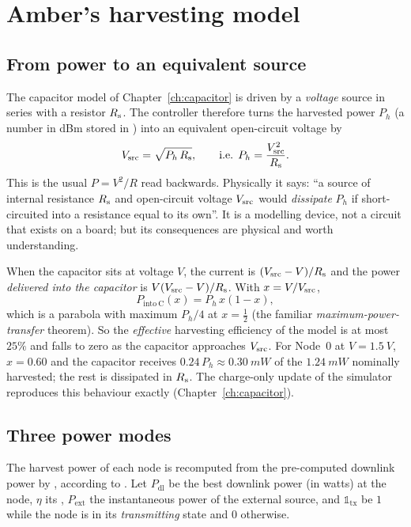\section{Amber's harvesting model}
\label{sec:amberharvest}

\subsection{From power to an equivalent source}

The capacitor model of Chapter~\ref{ch:capacitor} is driven by a
\emph{voltage} source in series with a resistor $R_{\mathrm{s}}$. The controller therefore
turns the harvested power $P_h$ (a number in dBm stored in )
into an equivalent open-circuit voltage by
\begin{equation}
 V_{\mathrm{src}}=\sqrt{P_h\,R_{\mathrm{s}}},\qquad\text{i.e. } P_h=\frac{V_{\mathrm{src}}^{2}}{R_{\mathrm{s}}}.
\label{eq:vsrc}
\end{equation}
This is the usual $P=V^2/R$ read backwards. Physically it says: ``a source of
internal resistance $R_{\mathrm{s}}$ and open-circuit voltage $V_{\mathrm{src}}$ would \emph{dissipate} $P_h$
if short-circuited into a resistance equal to its own''. It is a modelling device, not a
circuit that exists on a board; but its consequences are physical and worth
understanding.

\begin{intuition}
When the capacitor sits at voltage $V$, the current is $(V_{\mathrm{src}}-V)/R_{\mathrm{s}}$ and the power
\emph{delivered into the capacitor} is $V(V_{\mathrm{src}}-V)/R_{\mathrm{s}}$. With $x=V/V_{\mathrm{src}}$,
\[
 P_{\mathrm{into\ C}}(x)=P_h\,x(1-x),
\]
which is a parabola with maximum $P_h/4$ at $x=\tfrac12$ (the familiar
\emph{maximum-power-transfer} theorem). So the \emph{effective} harvesting efficiency of
the model is at most $25\%$ and falls to zero as the capacitor approaches $V_{\mathrm{src}}$.
For Node~0 at $V=\SI{1.5}{V}$, $x=0.60$ and the capacitor receives
$0.24\,P_h\approx\SI{0.30}{mW}$ of the $\SI{1.24}{mW}$ nominally harvested; the
rest is dissipated in $R_{\mathrm{s}}$. The charge-only update of the simulator reproduces this behaviour exactly
(Chapter~\ref{ch:capacitor}).
\end{intuition}

\subsection{Three power modes}

The harvest power of each node is recomputed from the pre-computed downlink power
by , according to .
Let $P_{\mathrm{dl}}$ be the best downlink power (in watts) at the node, $\eta$ its
, $P_{\mathrm{ext}}$ the instantaneous power of the external source,
and $\mathbb{1}_{\mathrm{tx}}$ be $1$ while the node is in its \emph{transmitting} state and $0$ otherwise.

